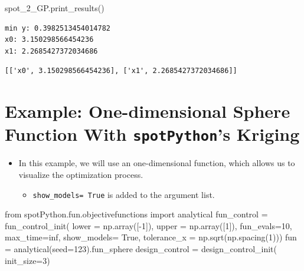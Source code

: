 \documentclass[
  letterpaper,
  DIV=11,
  numbers=noendperiod]{scrreprt}
\newenvironment{Shaded}{\begin{snugshade}}{\end{snugshade}}
\newcommand{\DecValTok}[1]{\textcolor[rgb]{0.68,0.00,0.00}{#1}}
\newcommand{\ImportTok}[1]{\textcolor[rgb]{0.00,0.46,0.62}{#1}}
\newcommand{\NormalTok}[1]{\textcolor[rgb]{0.00,0.23,0.31}{#1}}
\newcommand{\OperatorTok}[1]{\textcolor[rgb]{0.37,0.37,0.37}{#1}}
\newcommand{\VariableTok}[1]{\textcolor[rgb]{0.07,0.07,0.07}{#1}}
\providecommand{\tightlist}{%
  \setlength{\itemsep}{0pt}\setlength{\parskip}{0pt}}\usepackage{longtable,booktabs,array}
\begin{document}
\begin{Shaded}
\begin{Highlighting}[]
\NormalTok{spot\_2\_GP.print\_results()}
\end{Highlighting}
\end{Shaded}

\begin{verbatim}
min y: 0.3982513454014782
x0: 3.150298566454236
x1: 2.2685427372034686
\end{verbatim}

\begin{verbatim}
[['x0', 3.150298566454236], ['x1', 2.2685427372034686]]
\end{verbatim}

\section{\texorpdfstring{Example: One-dimensional Sphere Function With
\texttt{spotPython}'s
Kriging}{Example: One-dimensional Sphere Function With spotPython's Kriging}}\label{example-one-dimensional-sphere-function-with-spotpythons-kriging}

\begin{itemize}
\tightlist
\item
  In this example, we will use an one-dimensional function, which allows
  us to visualize the optimization process.

  \begin{itemize}
  \tightlist
  \item
    \texttt{show\_models=\ True} is added to the argument list.
  \end{itemize}
\end{itemize}

\begin{Shaded}
\begin{Highlighting}[]
\ImportTok{from}\NormalTok{ spotPython.fun.objectivefunctions }\ImportTok{import}\NormalTok{ analytical}
\NormalTok{fun\_control }\OperatorTok{=}\NormalTok{ fun\_control\_init(}
\NormalTok{    lower }\OperatorTok{=}\NormalTok{ np.array([}\OperatorTok{{-}}\DecValTok{1}\NormalTok{]),}
\NormalTok{    upper }\OperatorTok{=}\NormalTok{ np.array([}\DecValTok{1}\NormalTok{]),}
\NormalTok{    fun\_evals}\OperatorTok{=}\DecValTok{10}\NormalTok{,}
\NormalTok{    max\_time}\OperatorTok{=}\NormalTok{inf,}
\NormalTok{    show\_models}\OperatorTok{=} \VariableTok{True}\NormalTok{,}
\NormalTok{    tolerance\_x }\OperatorTok{=}\NormalTok{ np.sqrt(np.spacing(}\DecValTok{1}\NormalTok{)))}
\NormalTok{fun }\OperatorTok{=}\NormalTok{ analytical(seed}\OperatorTok{=}\DecValTok{123}\NormalTok{).fun\_sphere}
\NormalTok{design\_control }\OperatorTok{=}\NormalTok{ design\_control\_init(}
\NormalTok{    init\_size}\OperatorTok{=}\DecValTok{3}\NormalTok{)}
\end{Highlighting}
\end{Shaded}
\end{document}
